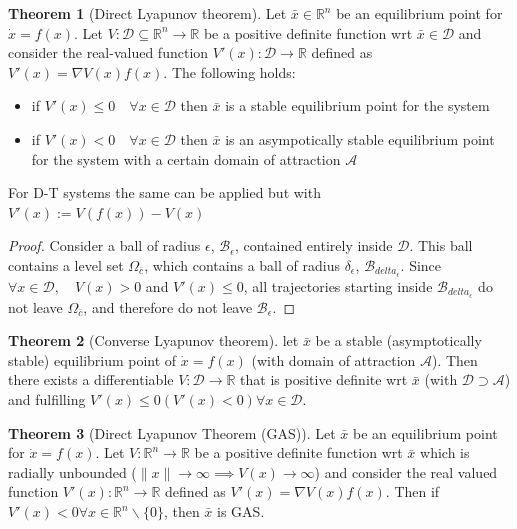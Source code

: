 \documentclass{book}
\newcommand{\R}{\mathbb{R}}
\theoremstyle{definition}
\newtheorem{theorem}{Theorem}[section]
\theoremstyle{remark}
\theoremstyle{remark}
\begin{document}
\begin{theorem}[Direct Lyapunov theorem]
    Let $\bar{x} \in \R^n$ be an equilibrium point for $\dot{x}=f(x)$. Let $V:\mathcal{D}\subseteq \R^n \to \R$ be a positive definite function wrt $\bar{x}\in\mathcal{D}$ and consider the real-valued function $V'(x):\mathcal{D} \to \R$ defined as $V'(x)=\nabla V(x)f(x)$. The following holds:
    \begin{itemize}
        \item if $V'(x)\leq 0 \quad \forall x\in\mathcal{D}$ then $\bar{x}$ is a stable equilibrium point for the system
        \item if $V'(x)< 0 \quad \forall x\in\mathcal{D}$ then $\bar{x}$ is an asympotically stable equilibrium point for the system with a certain domain of attraction $\mathcal{A}$
    \end{itemize}
    For D-T systems the same can be applied but with $V'(x):=V(f(x))-V(x)$
\end{theorem}
\begin{proof}
    Consider a ball of radius $\epsilon$, $\mathcal{B}_{\epsilon}$, contained entirely inside $\mathcal{D}$. This ball contains a level set $\Omega_{\bar{c}}$, which contains a ball of radius $\delta_{\epsilon}$, $\mathcal{B}_{delta_{\epsilon}}$. Since $\forall x \in \mathcal{D},\quad V(x)>0$ and $V'(x)\leq 0$, all trajectories starting inside $\mathcal{B}_{delta_{\epsilon}}$ do not leave $\Omega_{\bar{c}}$, and therefore do not leave $\mathcal{B}_{\epsilon}$.
\end{proof}
\begin{theorem}[Converse Lyapunov theorem]
    let $\bar{x}$ be a stable (asymptotically stable) equilibrium point of $\dot{x}=f(x)$ (with domain of attraction $\mathcal{A}$). Then there exists a differentiable $V:\mathcal{D} \to \R$ that is positive definite wrt $\bar{x}$ (with $\mathcal{D} \supset \mathcal{A}$) and fulfilling $V'(x)\leq 0 (V'(x)<0) \forall x \in \mathcal{D}$. 
\end{theorem}

\begin{theorem}[Direct Lyapunov Theorem (GAS)]
    Let $\bar{x}$ be an equilibrium point for $\dot{x}=f(x)$. Let $V:\R^n\to \R$ be a positive definite function wrt $\bar{x}$ which is radially unbounded ($\|x\|\to\infty\implies V(x)\to\infty$) and consider the real valued function $V'(x):\R^n\to\R$ defined as $V'(x)=\nabla V(x)f(x)$. Then if $V'(x)<0\forall x \in\R^n\backslash\{0\}$, then $\bar{x}$ is GAS.
\end{theorem}
\end{document}
